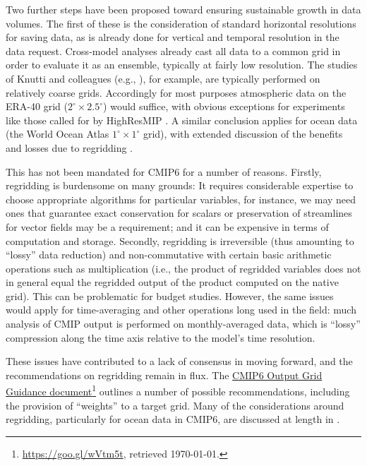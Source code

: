 \documentclass[gmd,manuscript]{copernicus}
\newcommand{\pllabel}[1]{\label{p-#1}\linelabel{l-#1}}
\newcommand{\urlref}[2] {\href{#1}{#2}\footnote{\url{#1}, retrieved \today.}}
\begin{document}
Two further steps have been proposed toward ensuring sustainable
growth in data volumes.
\pllabel{RC2-21}
The first of these is the consideration of standard horizontal
resolutions for saving data, as is already done for vertical and
temporal resolution in the data request. Cross-model analyses already
cast all data to a common grid in order to evaluate it as an ensemble,
typically at fairly low resolution. The studies of Knutti and
colleagues (e.g., \cite{ref:knuttietal2017}), for example, are typically performed
on relatively coarse grids. Accordingly for most purposes
atmospheric data on the ERA-40 grid ($2^\circ\times 2.5^\circ$) would
suffice, with obvious exceptions for experiments like those called
for by HighResMIP \citep{ref:haarsmaetal2016}. A similar
conclusion applies for ocean data (the World Ocean Atlas
$1^\circ\times 1^\circ$ grid), with extended discussion of the
benefits and losses due to regridding
\citep[see][]{ref:griffiesetal2014,ref:griffiesetal2016}.
\pllabel{RC3-14}

This has not been mandated for CMIP6 for a number of reasons. Firstly,
regridding is burdensome on many grounds: It requires considerable
expertise to choose appropriate algorithms for particular variables,
for instance, we may need ones that guarantee exact conservation for
scalars or preservation of streamlines for vector fields may be a
requirement; and it can be expensive in terms of computation and
storage. Secondly, regridding is irreversible (thus amounting to
``lossy'' data reduction) and non-commutative with certain basic
arithmetic operations such as multiplication (i.e., the product of
regridded variables does not in general equal the regridded output of
the product computed on the native grid). This can be problematic for
budget studies. However, the same issues would apply for
time-averaging and other operations long used in the field: much
analysis of CMIP output is performed on monthly-averaged data, which
is ``lossy'' compression along the time axis relative to the model's
time resolution.

These issues have contributed to a lack of consensus in moving forward,
and the recommendations on regridding remain in flux. The
\urlref{https://goo.gl/wVtm5t}{CMIP6 Output Grid Guidance document}
outlines a number of possible recommendations, including the provision
of ``weights'' to a target grid. Many of the considerations around
regridding, particularly for ocean data in CMIP6, are discussed at
length in \cite{ref:griffiesetal2016}. 
\end{document}
